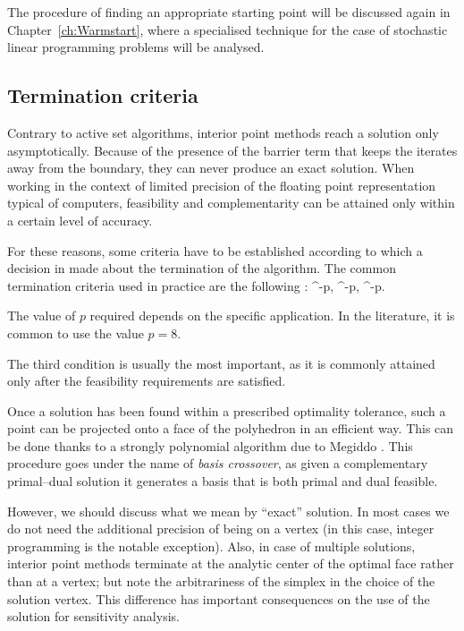 The procedure of finding an appropriate starting point will be discussed
again in Chapter~\ref{ch:Warmstart}, where a specialised technique for
the case of stochastic linear programming problems will be analysed.


%
%
\subsection{Termination criteria}

Contrary to active set algorithms, interior point methods reach a
solution only asymptotically. 
Because of the presence of the barrier term that keeps the iterates
away from the boundary, they can never produce an exact solution.
When working in the context of limited precision of the
floating point representation typical of computers, feasibility and
complementarity can be attained only within a certain level
of accuracy.

For these reasons, some criteria have to be established according
to which a decision in made about the termination of the algorithm.
The common termination criteria used in practice are the
following \cite{GondzioTerlaky}:
\be  \label{eq:TerminationCriteria}
  ^{-p}, 
\qquad
{}  ^{-p},
\qquad
{}  ^{-p}.
\ee

The value of $p$ required depends on the specific application.
In the literature, it is common to use the value $p = 8$.

The third condition is usually the most important, as it is
commonly attained only after the feasibility requirements are satisfied.


Once a solution has been found within a prescribed 
optimality tolerance, such a point can be projected onto a face 
of the polyhedron in an efficient way.
This can be done thanks to a strongly polynomial algorithm due
to Megiddo \cite{Megiddo91}. This procedure goes under the name
of {\em basis crossover}, 
as given a complementary primal--dual solution it generates a basis 
that is both primal and dual feasible.

However, we should discuss what we mean by ``exact'' solution. In most
cases we do not need the additional precision of being on a vertex (in
this case, integer programming is the notable exception).
Also, in case of multiple solutions, interior point methods terminate
at the analytic center of the optimal face rather than at a vertex; 
but note the arbitrariness of the simplex in the choice of the solution
vertex.
This difference has important consequences on the use of the solution
for sensitivity analysis. 

